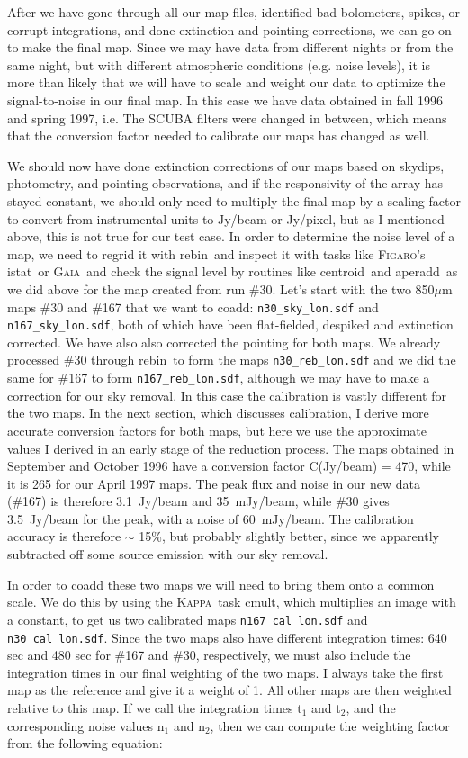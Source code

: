 \documentclass[twoside,11pt]{article}
\newcommand{\Kappa}{\xref{\textsc{Kappa}}{sun95}{}}
\newcommand{\Figaro}{\xref{\textsc{Figaro}}{sun86}{}}
\newcommand{\gaia}{\xref{\textsc{Gaia}}{sun214}{}}
\newcommand{\task}[1]{\textsf{#1}}
\newcommand{\rebin}{\xref{\task{rebin}}{sun216}{REBIN}}
\newcommand{\aperadd}{\xref{\task{aperadd}}{sun95}{APERADD}}
\newcommand{\centroid}{\xref{\task{centroid}}{sun95}{CENTROID}}
\newcommand{\cmult}{\xref{\task{cmult}}{sun95}{CMULT}}
\newcommand{\istat}{\xref{\task{istat}}{sun86}{ISTAT}}
\newcommand{\xref}[3]{#1}
\begin{document}
{After we have gone through all our map files, identified bad bolometers,
spikes, or corrupt integrations, and done extinction and pointing
corrections, we can go on to make the final map.  Since we may have
data from different nights or from the same night, but with different
atmospheric conditions (e.g. noise levels), it is more than likely that we
will have to scale and weight our data to optimize the signal-to-noise in
our final map. In this case we have data obtained in fall 1996 and spring
1997, i.e. The SCUBA filters were changed in between, which means that
the conversion factor needed to calibrate our maps has changed as well.

We should now have done extinction corrections of our maps based on
skydips, photometry, and pointing observations, and if the responsivity
of the array has stayed constant, we should only need to multiply the
final map by a scaling factor to convert from instrumental units to
Jy/beam or Jy/pixel, but as I mentioned above, this is not
true for our test case. In order to determine the noise level of a map,
we need to regrid it with \rebin\ and inspect it with tasks like
\Figaro's \istat\ or \gaia\ and check the signal level by routines like
\centroid\ and \aperadd\ as we did above for the map created from
run \#30.  Let's start with the two 850$\mu$m maps \#30 and \#167 that
we want to coadd: \texttt{n30\_sky\_lon.sdf} and \texttt{n167\_sky\_lon.sdf},
both of which have been flat-fielded, despiked and extinction corrected. We
have also also corrected the pointing for both maps. We already processed
\#30 through \rebin\ to form the maps \texttt{n30\_reb\_lon.sdf} and we
did the same for \#167 to form \texttt{n167\_reb\_lon.sdf}, although
we may have to make a correction for our sky removal. In this case the
calibration is vastly different for the two maps. In the next section,
which discusses calibration, I derive more accurate conversion factors
for both maps, but here we use the approximate values I derived in an
early stage of the reduction process. The maps obtained in September and
October 1996 have a conversion factor C(Jy/beam) = 470, while it is  265
for our April 1997 maps. The peak flux and noise in our new data (\#167)
is therefore 3.1~Jy/beam and 35~mJy/beam, while \#30 gives
3.5~Jy/beam for the peak, with a noise of 60~mJy/beam. The
calibration accuracy is therefore $\sim$ 15\%, but probably slightly
better, since we apparently subtracted off some source emission with
our sky removal.

In order to coadd these two maps we will need to bring them onto a
common scale.  We do this by using the \Kappa\ task \cmult, which
multiplies an image with a constant, to get us two calibrated maps
\texttt{n167\_cal\_lon.sdf} and \texttt{n30\_cal\_lon.sdf}. Since the two maps
also have different integration times: 640 sec and 480 sec for \#167
and \#30, respectively, we must also include the integration times in
our final weighting of the two maps. I always take the first map as
the reference and give it a weight of 1. All other maps are then weighted
relative to this map. If we call the integration times t$_1$ and t$_2$,
and the corresponding noise values n$_1$ and n$_2$, then we can compute
the weighting factor from the following equation: 

}
\end{document}
